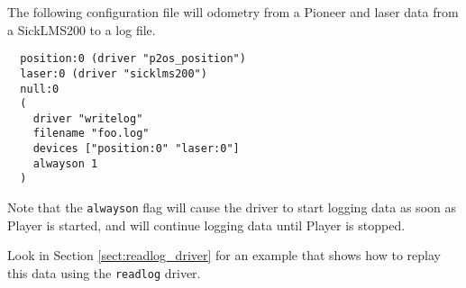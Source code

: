 The following configuration file will odometry from a Pioneer
and laser data from a SickLMS200 to a log file.
  \begin{verbatim}
  position:0 (driver "p2os_position")
  laser:0 (driver "sicklms200")
  null:0 
  (
    driver "writelog" 
    filename "foo.log" 
    devices ["position:0" "laser:0"]
    alwayson 1
  )
  \end{verbatim}
Note that the {\tt alwayson} flag will cause the driver to start
logging data as soon as Player is started, and will continue logging
data until Player is stopped.

Look in Section \ref{sect:readlog_driver} for an example that shows
how to replay this data using the {\tt readlog} driver.



